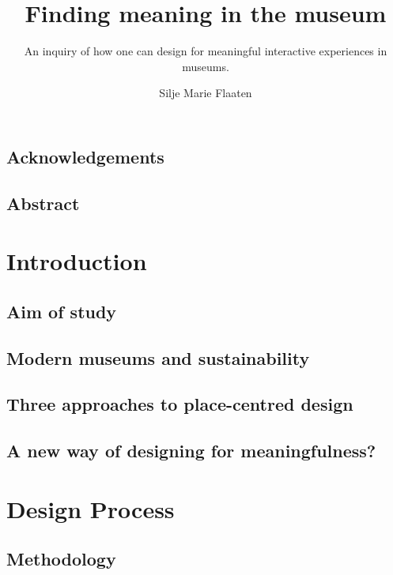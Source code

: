 \documentclass[UKenglish, a4paper]{ifimaster}
\title{Finding meaning in the museum}
\subtitle{An inquiry of how one can design for meaningful interactive experiences in museums.}
\author{Silje Marie Flaaten}
\begin{document}
\duoforside[dept={Department of Informatics}, program={Informatics: design, use, interaction},long]
\frontmatter{}

\chapter*{Acknowledgements}


\chapter*{Abstract}


\tableofcontents{}
\listoffigures{}
\listoftables{}

\mainmatter{}

\part{Introduction}

\chapter{ Aim of study}


\chapter{ Modern museums and sustainability}


\chapter{ Three approaches to place-centred design}


\chapter{ A new way of designing for meaningfulness?}



\part{Design Process}

\chapter{ Methodology}

\end{document}
